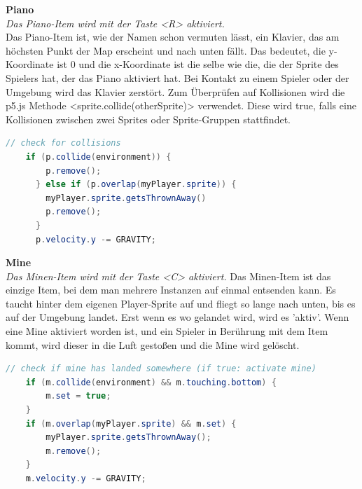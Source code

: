 \textbf{Piano}
\\
\textit{Das Piano-Item wird mit der Taste <R> aktiviert.}
\\
Das Piano-Item ist, wie der Namen schon vermuten lässt, ein Klavier, das am höchsten Punkt der Map erscheint und nach unten fällt.
Das bedeutet, die y-Koordinate ist 0 und die x-Koordinate ist die selbe wie die, die der Sprite des Spielers hat, der das Piano aktiviert hat.
 Bei Kontakt zu einem Spieler oder der Umgebung wird das Klavier zerstört. Zum Überprüfen auf Kollisionen wird die p5.js Methode <sprite.collide(otherSprite)> verwendet.
 Diese wird true, falls eine Kollisionen zwischen zwei Sprites oder Sprite-Gruppen stattfindet.
\\
\begin{lstlisting}[caption=Piano-Item Physics,language=Java,label=lst:impl:pianoPhy]
    // check for collisions
    if (p.collide(environment)) {
        p.remove();
      } else if (p.overlap(myPlayer.sprite)) {
        myPlayer.sprite.getsThrownAway()
        p.remove();
      }
      p.velocity.y -= GRAVITY;
\end{lstlisting}

\textbf{Mine}
\\
\textit{Das Minen-Item wird mit der Taste <C> aktiviert.}
Das Minen-Item ist das einzige Item, bei dem man mehrere Instanzen auf einmal entsenden kann. 
Es taucht hinter dem eigenen Player-Sprite auf und fliegt so lange nach unten, bis es auf der Umgebung landet. Erst wenn es wo gelandet wird, wird es 'aktiv'.
Wenn eine Mine aktiviert worden ist, und ein Spieler in Berührung mit dem Item kommt, wird dieser in die Luft gestoßen und die Mine wird gelöscht.
\\
\begin{lstlisting}[caption=Mine-Item Physics,language=Java,label=lst:impl:minePhy]
    // check if mine has landed somewhere (if true: activate mine)
    if (m.collide(environment) && m.touching.bottom) {
        m.set = true;
    }
    if (m.overlap(myPlayer.sprite) && m.set) {
        myPlayer.sprite.getsThrownAway();
        m.remove();
    }
    m.velocity.y -= GRAVITY;
\end{lstlisting}

